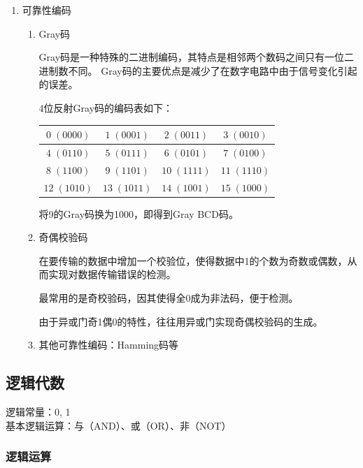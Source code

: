 \documentclass[UTF8,fontset=fandol,zihao=5]{ctexart}
\begin{document}
\begin{enumerate}
  \item 可靠性编码
\begin{enumerate}[label=(\arabic*)]
  \item Gray码

Gray码是一种特殊的二进制编码，其特点是相邻两个数码之间只有一位二进制数不同。
Gray码的主要优点是减少了在数字电路中由于信号变化引起的误差。

4位反射Gray码的编码表如下：
\begin{table}[htbp]
    \centering
    \begin{tabular}{|c|c|c|c|}
        \hline
        $0\;(0000)$  & $1\;(0001)$  & $2\;(0011)$  & $3\;(0010)$  \\
        \hline
        $4\;(0110)$  & $5\;(0111)$  & $6\;(0101)$  & $7\;(0100)$  \\
        \hline
        $8\;(1100)$  & $9\;(1101)$  & $10\;(1111)$ & $11\;(1110)$ \\
        \hline
        $12\;(1010)$ & $13\;(1011)$ & $14\;(1001)$ & $15\;(1000)$ \\
        \hline
    \end{tabular}
\end{table}

将9的Gray码换为1000，即得到Gray BCD码。
  \item 奇偶校验码

在要传输的数据中增加一个校验位，使得数据中1的个数为奇数或偶数，从而实现对数据传输错误的检测。

最常用的是奇校验码，因其使得全0成为非法码，便于检测。

由于异或门奇1偶0的特性，往往用异或门实现奇偶校验码的生成。
  \item 其他可靠性编码：Hamming码等

\end{enumerate}
\end{enumerate}

\subsection{逻辑代数}

逻辑常量：0, 1 \\
基本逻辑运算：与（AND）、或（OR）、非（NOT）

\subsubsection{逻辑运算}
\end{document}
